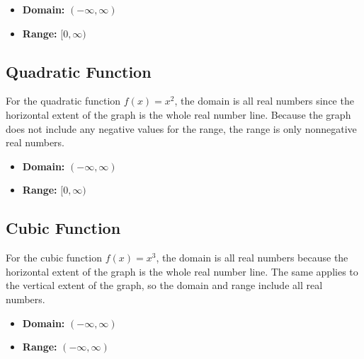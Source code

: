 
\begin{itemize}
    \item \textbf{Domain:} $(-\infty ,\infty)$
    \item \textbf{Range:} $[0 ,\infty)$
\end{itemize}

\subsection{Quadratic Function}
\label{sss:quad-a21f}

For the quadratic function $f(x) = x^2$, the domain is all real numbers since the horizontal extent of the graph is the whole real number line. Because the graph does not include any negative values for the range, the range is only nonnegative real numbers.


\begin{itemize}
    \item \textbf{Domain:} $(-\infty ,\infty)$
    \item \textbf{Range:} $[0 ,\infty)$
\end{itemize}

\subsection{Cubic Function}
\label{sss:cubi-6dd3}

For the cubic function $f(x) = x^3$, the domain is all real numbers because the horizontal extent of the graph is the whole real number line. The same applies to the vertical extent of the graph, so the domain and range include all real numbers.


\begin{itemize}
    \item \textbf{Domain:} $(-\infty ,\infty)$
    \item \textbf{Range:} $(-\infty ,\infty)$
\end{itemize}

